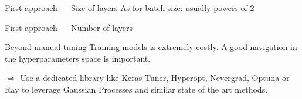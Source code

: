 \begin{frame}{First approach --- Size of layers}
  As for batch size: usually powers of 2
\end{frame}

\begin{frame}{First approach --- Number of layers}
\end{frame}

\begin{frame}{Beyond manual tuning}
  Training models is extremely costly.
  A good navigation in the hyperparameters space is important.

  $\Rightarrow$ Use a dedicated library like Keras Tuner, Hyperopt, Nevergrad, Optuna or Ray to leverage Gaussian Processes and similar state of the art methods.
\end{frame}
